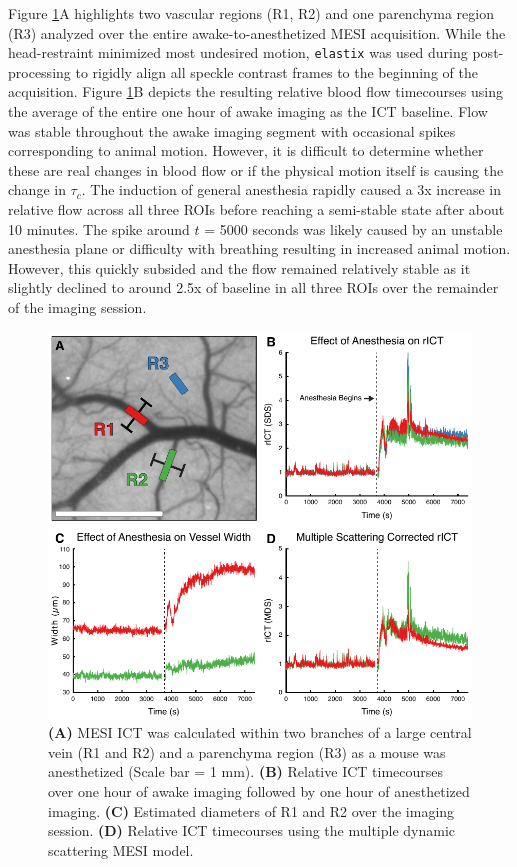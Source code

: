 Figure \ref{fig:flowawakeanes}A highlights two vascular regions (R1, R2) and one parenchyma region (R3) analyzed over the entire awake-to-anesthetized MESI acquisition. While the head-restraint minimized most undesired motion, \texttt{elastix} was used during post-processing to rigidly align all speckle contrast frames to the beginning of the acquisition. Figure \ref{fig:flowawakeanes}B depicts the resulting relative blood flow timecourses using the average of the entire one hour of awake imaging as the ICT baseline. Flow was stable throughout the awake imaging segment with occasional spikes corresponding to animal motion. However, it is difficult to determine whether these are real changes in blood flow or if the physical motion itself is causing the change in $\tau_c$. The induction of general anesthesia rapidly caused a 3x increase in relative flow across all three ROIs before reaching a semi-stable state after about 10 minutes. The spike around $t$ = 5000 seconds was likely caused by an unstable anesthesia plane or difficulty with breathing resulting in increased animal motion. However, this quickly subsided and the flow remained relatively stable as it slightly declined to around 2.5x of baseline in all three ROIs over the remainder of the imaging session.

\begin{figure}
    \includegraphics{figures/chapter_5/flowawakeanes.pdf}
    \caption{
        \label{fig:flowawakeanes}
        \textbf{(A)} MESI ICT was calculated within two branches of a large central vein (R1 and R2) and a parenchyma region (R3) as a mouse was anesthetized (Scale bar = 1 mm). \textbf{(B)} Relative ICT timecourses over one hour of awake imaging followed by one hour of anesthetized imaging. \textbf{(C)} Estimated diameters of R1 and R2 over the imaging session. \textbf{(D)} Relative ICT timecourses using the multiple dynamic scattering MESI model.
    }
\end{figure}


